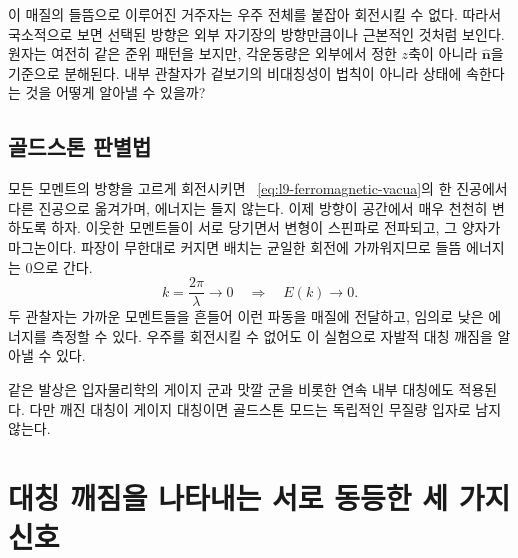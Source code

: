 이 매질의 들뜸으로 이루어진 거주자는 우주 전체를 붙잡아 회전시킬 수 없다. 따라서 국소적으로 보면 선택된 방향은 외부 자기장의 방향만큼이나 근본적인 것처럼 보인다. 원자는 여전히 같은 준위 패턴을 보지만, 각운동량은 외부에서 정한 \(z\)축이 아니라 \(\hat{\mathbf n}\)을 기준으로 분해된다. 내부 관찰자가 겉보기의 비대칭성이 법칙이 아니라 상태에 속한다는 것을 어떻게 알아낼 수 있을까?

\subsection{골드스톤 판별법}

모든 모멘트의 방향을 고르게 회전시키면 ~\eqref{eq:l9-ferromagnetic-vacua}의 한 진공에서 다른 진공으로 옮겨가며, 에너지는 들지 않는다. 이제 방향이 공간에서 매우 천천히 변하도록 하자. 이웃한 모멘트들이 서로 당기면서 변형이 스핀파로 전파되고, 그 양자가 마그논이다. 파장이 무한대로 커지면 배치는 균일한 회전에 가까워지므로 들뜸 에너지는 0으로 간다.
\begin{equation}
k=\frac{2\pi}{\lambda}\longrightarrow0
\quad\Longrightarrow\quad
E(k)\longrightarrow0.
\label{eq:l9-gapless-magnon}
\end{equation}
두 관찰자는 가까운 모멘트들을 흔들어 이런 파동을 매질에 전달하고, 임의로 낮은 에너지를 측정할 수 있다. 우주를 회전시킬 수 없어도 이 실험으로 자발적 대칭 깨짐을 알아낼 수 있다.


같은 발상은 입자물리학의 게이지 군과 맛깔 군을 비롯한 연속 내부 대칭에도 적용된다. 다만 깨진 대칭이 게이지 대칭이면 골드스톤 모드는 독립적인 무질량 입자로 남지 않는다.

\begin{classroomqa}
\end{classroomqa}

\section{대칭 깨짐을 나타내는 서로 동등한 세 가지 신호}

